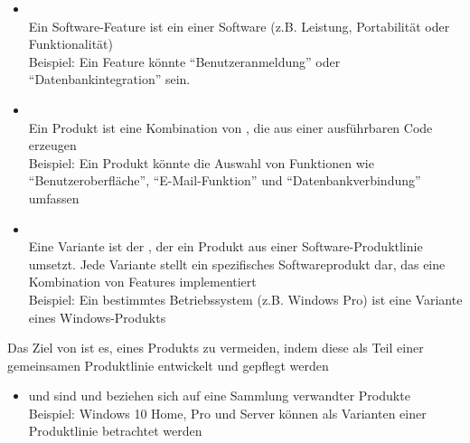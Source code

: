 \begin{infoBox}[title=Terminologie von Software Product Line Engineering (SPLE)]
    \begin{itemize}
        \item {}\\ Ein Software-Feature ist ein  einer Software (z.B. Leistung, Portabilität oder Funktionalität)\\
        Beispiel: Ein Feature könnte \enquote{Benutzeranmeldung} oder \enquote{Datenbankintegration} sein.
        \item {}\\ Ein Produkt ist eine Kombination von , die aus einer  ausführbaren Code erzeugen\\
        Beispiel: Ein Produkt könnte die Auswahl von Funktionen wie \enquote{Benutzeroberfläche}, \enquote{E-Mail-Funktion} und \enquote{Datenbankverbindung} umfassen
        \item {}\\ Eine Variante ist der , der ein Produkt aus einer Software-Produktlinie umsetzt. Jede Variante stellt ein spezifisches Softwareprodukt dar, das eine Kombination von Features implementiert\\
        Beispiel: Ein bestimmtes Betriebssystem (z.B. Windows Pro) ist eine Variante eines Windows-Produkts
    \end{itemize}
\end{infoBox}
\begin{infoBox}[title=Ziel von Software Product Line Engineering]
    Das Ziel von  ist es,  eines Produkts zu vermeiden, indem diese als Teil einer gemeinsamen Produktlinie entwickelt und gepflegt werden
    \begin{itemize}
        \item {} und  sind  und beziehen sich auf eine Sammlung verwandter Produkte\\
        Beispiel: Windows 10 Home, Pro und Server können als Varianten einer Produktlinie betrachtet werden
    \end{itemize}
\end{infoBox}
